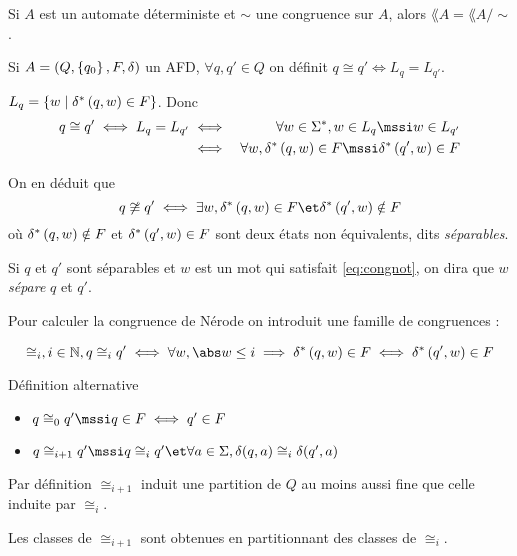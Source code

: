 \begin{prop}
	Si $A$ est un automate déterministe et $\sim$ une congruence sur $A$, alors $\lang A = \lang {A/\sim}$.
\end{prop}


\begin{definition}
	Si $A = (Q, \left\{q_0\right\}, F, \delta)$ un AFD, $\forall q, q' \in Q$ on définit $q \cong q' \iff L_q = L_{q'}$.
\end{definition}

\begin{rappel}
	$L_q = \left\{w \mid \delta^{*} \left(q,w\right) \in F\right\}$.
	Donc
	\begin{eqnarray*}
		q \cong q' \iff L_q = L_{q'} &\iff& \forall w \in \mots, w \in L_q \mssi w \in L_{q'} \\
		&\iff& \forall w, \deltaS q w \in F \mssi  \deltaS {q'} w \in F
	\end{eqnarray*}

	On en déduit que
	\begin{equation}\label{eq:congnot}
		q \not\cong q' \iff \exists w, \deltaS q w \in F \et \deltaS {q'} w \notin F
	\end{equation}
	où $\delta^{*} \left(q,w\right) \notin F$ et $\delta^{*} \left(q',w\right) \in F$ sont deux états non équivalents, dits \emph{séparables}.
\end{rappel}

Si $q$ et $q'$ sont séparables et $w$ est un mot qui satisfait \ref{eq:congnot}, on dira que $w$ \emph{sépare} $q$ et $q'$.


Pour calculer la congruence de Nérode on introduit une famille de congruences :

\begin{equation*}
	\cong_i, i  \in \N, q \cong_i q' \iff \forall w, \abs w \leq i \implies \deltaS q w \in F \iff  \deltaS {q'} w \in F
\end{equation*}


\begin{definition}
	Définition alternative

	\begin{itemize}
		\item $q \cong_0 q' \mssi q\in F \iff q' \in F$
		\item $q \cong_{i+1} q' \mssi q \cong_{i} q' \et  \forall a \in \alphabet, \delta (q,a) \cong_i \delta (q', a)$
	\end{itemize}
\end{definition}

\begin{remarque}
	Par définition $\cong_{i+1}$ induit une partition de $Q$ au moins aussi fine que celle induite par $\cong_i$.

	Les classes de $\cong_{i+1}$ sont obtenues en partitionnant des classes de $\cong_i$.
\end{remarque}

